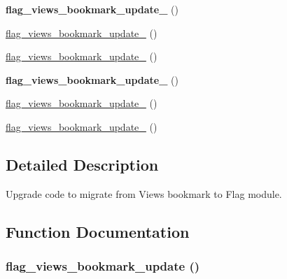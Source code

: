 \begin{CompactItemize}
\item 
\hypertarget{flag_8views__bookmark_8inc_0d88a5b63f33a0e587c93de9b8de0a15}{
\textbf{flag\_\-views\_\-bookmark\_\-update\_} ()}
\label{flag_8views__bookmark_8inc_0d88a5b63f33a0e587c93de9b8de0a15}

\item 
\hyperlink{flag_8views__bookmark_8inc_37e9f392694b130110e5f2cb26b31cb4}{flag\_\-views\_\-bookmark\_\-update\_} ()
\item 
\hyperlink{flag_8views__bookmark_8inc_4f23f5f0988c3bc3f7bfcb815f8fd260}{flag\_\-views\_\-bookmark\_\-update\_} ()
\item 
\hypertarget{flag_8views__bookmark_8inc_1db93b497eb3823be30503d4b91493ef}{
\textbf{flag\_\-views\_\-bookmark\_\-update\_} ()}
\label{flag_8views__bookmark_8inc_1db93b497eb3823be30503d4b91493ef}

\item 
\hyperlink{flag_8views__bookmark_8inc_cc71127082d102ce3a9b4bed39743f83}{flag\_\-views\_\-bookmark\_\-update\_} ()
\item 
\hyperlink{flag_8views__bookmark_8inc_298793c4236ee9f00e26b9d0ec7d7e7d}{flag\_\-views\_\-bookmark\_\-update\_} ()
\end{CompactItemize}


\subsection{Detailed Description}
Upgrade code to migrate from Views bookmark to Flag module. 

\subsection{Function Documentation}
\hypertarget{flag_8views__bookmark_8inc_a39d7b88115e14a84c01e143c335d838}{
\subsubsection[{flag\_\-views\_\-bookmark\_\-update}]{\setlength{\rightskip}{0pt plus 5cm}flag\_\-views\_\-bookmark\_\-update ()}}
\label{flag_8views__bookmark_8inc_a39d7b88115e14a84c01e143c335d838}


